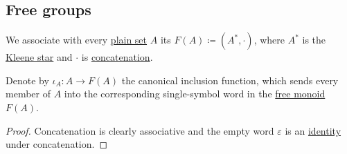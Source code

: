 \subsection{Free groups}\label{subsec:free_groups}

\begin{definition}\label{def:free_monoid}
  We associate with every \hyperref[def:set]{plain set} \( A \) its  \( F(A) \coloneqq (A^*, \cdot) \), where \( A^* \) is the \hyperref[def:formal_language/kleene_star]{Kleene star} and \( \cdot \) is \hyperref[def:formal_language/concatenation]{concatenation}.

  Denote by \( \iota_A: A \to F(A) \) the canonical inclusion function, which sends every member of \( A \) into the corresponding single-symbol word in the \hyperref[def:free_monoid]{free monoid} \( F(A) \).
\end{definition}
\begin{proof}
  Concatenation is clearly associative and the empty word \( \varepsilon \) is an \hyperref[def:monoid]{identity} under concatenation.
\end{proof}


